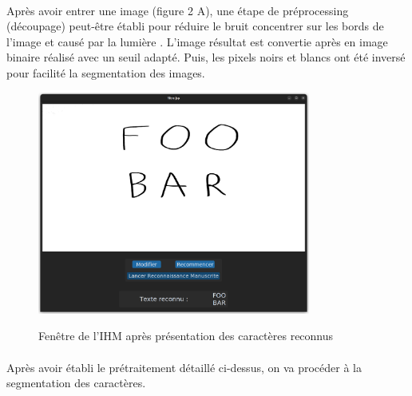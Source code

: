 \documentclass[a4paper]{article}
\begin{document}
			\paragraph{}
				Après avoir entrer une image (figure 2 A), une étape de préprocessing (découpage) peut-être établi pour réduire le bruit concentrer sur les bords de l'image et causé par la lumière .
				L'image résultat est convertie après en image binaire réalisé avec un seuil adapté. Puis, les pixels noirs et blancs ont été inversé pour facilité la segmentation des images.
			\begin{figure}[H]
				\caption{Fenêtre de l'IHM après présentation des caractères reconnus}
				\includegraphics[width=0.8\textwidth]{recon.png}
				\centering
				\label{fig:recon}
			\end{figure}
			\paragraph{} Après avoir établi le prétraitement détaillé ci-dessus, on va procéder à la segmentation des caractères.
\end{document}
